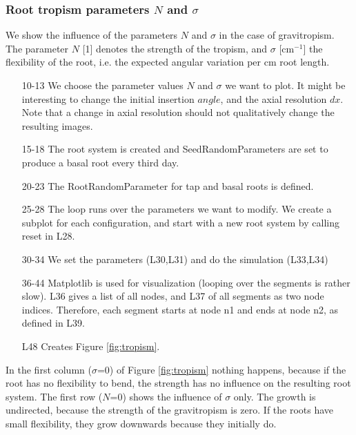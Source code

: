\subsubsection*{Root tropism parameters $N$ and $\sigma$} \label{ssec:tropism}

We show the influence of the parameters $N$ and $\sigma$ in the case of gravitropism. The parameter $N$ [1] denotes the strength of the tropism, and $\sigma$ [cm$^{-1}$] the flexibility of the root, i.e. the expected angular variation per cm root length. 



\begin{itemize}
\item[10-13] We choose the parameter values $N$ and $\sigma$ we want to plot. It might be interesting to change the initial insertion $angle$, and the axial resolution $dx$. Note that a change in axial resolution should not qualitatively change the resulting images.

\item[15-18] The root system is created and SeedRandomParameters are set to produce a basal root every third day. 

\item[20-23] The RootRandomParameter for tap and basal roots is defined.

\item[25-28] The loop runs over the parameters we want to modify. We create a subplot for each configuration, and start with a new root system by calling reset in L28.

\item[30-34] We set the parameters (L30,L31) and do the simulation (L33,L34)

\item[36-44] Matplotlib is used for visualization (looping over the segments is rather slow). L36 gives a list of all nodes, and L37 of all segments as two node indices. Therefore, each segment starts at node n1 and ends at node n2, as defined in L39.

\item[L48] Creates Figure \ref{fig:tropism}.
\end{itemize}

In the first column ($\sigma$=0) of Figure \ref{fig:tropism} nothing happens, because if the root has no flexibility to bend, the strength has no influence on the resulting root system. The first row ($N$=0) shows the influence of $\sigma$ only. The growth is undirected, because the strength of the gravitropism is zero. If the roots have small flexibility, they grow downwards because they initially do. 

